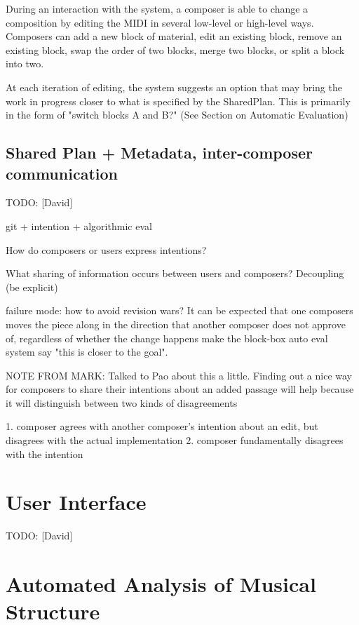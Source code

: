\documentclass[final,authoryear,11pt,times]{elsarticle}
\begin{document}
During an interaction with the system, a composer is able to change a composition by editing the MIDI in several low-level or high-level ways. Composers can add a new block of material, edit an existing block, remove an existing block, swap the order of two blocks, merge two blocks, or split a block into two.

At each iteration of editing, the system suggests an option that may bring the work in progress closer to what is specified by the SharedPlan. This is primarily in the form of "switch blocks A and B?" (See Section on Automatic Evaluation)

\subsection{Shared Plan + Metadata, inter-composer communication}

TODO: [David]

git + intention + algorithmic eval

How do composers or users express intentions?

What sharing of information occurs between users and composers? Decoupling (be explicit)

failure mode: how to avoid revision wars? It can be expected that one composers moves the piece along in the direction that another composer does not approve of, regardless of whether the change happens make the block-box auto eval system say "this is closer to the goal".

NOTE FROM MARK: Talked to Pao about this a little. Finding out a nice way for composers to share their intentions about an added passage will help because it will distinguish between two kinds of disagreements

1. composer agrees with another composer's intention about an edit, but disagrees with the actual implementation
2. composer fundamentally disagrees with the intention






\section{User Interface}

TODO: [David]


\section{Automated Analysis of Musical Structure}
\end{document}
